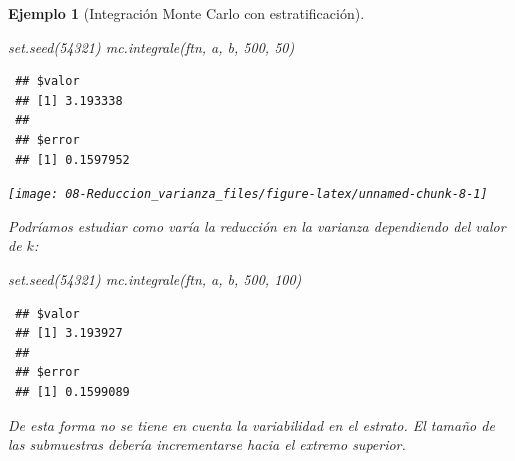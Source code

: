 \documentclass[
]{book}
\newenvironment{Shaded}{\begin{snugshade}}{\end{snugshade}}
\newcommand{\DecValTok}[1]{\textcolor[rgb]{0.00,0.00,0.81}{#1}}
\newcommand{\FunctionTok}[1]{\textcolor[rgb]{0.00,0.00,0.00}{#1}}
\newcommand{\NormalTok}[1]{#1}
\theoremstyle{break}
\newtheorem{example}{Ejemplo}[chapter]
\theoremstyle{nonumberplain}
\begin{document}
\begin{example}[Integración Monte Carlo con estratificación]
\begin{Shaded}
\begin{Highlighting}[]
\FunctionTok{set.seed}\NormalTok{(}\DecValTok{54321}\NormalTok{)}
\FunctionTok{mc.integrale}\NormalTok{(ftn, a, b, }\DecValTok{500}\NormalTok{, }\DecValTok{50}\NormalTok{)}
\end{Highlighting}
\end{Shaded}

\begin{verbatim}
 ## $valor
 ## [1] 3.193338
 ## 
 ## $error
 ## [1] 0.1597952
\end{verbatim}

\begin{center}\texttt{[image: 08-Reduccion\_varianza\_files/figure-latex/unnamed-chunk-8-1]} \end{center}

Podríamos estudiar como varía la reducción en la varianza dependiendo del valor de \(k\):

\begin{Shaded}
\begin{Highlighting}[]
\FunctionTok{set.seed}\NormalTok{(}\DecValTok{54321}\NormalTok{)}
\FunctionTok{mc.integrale}\NormalTok{(ftn, a, b, }\DecValTok{500}\NormalTok{, }\DecValTok{100}\NormalTok{)}
\end{Highlighting}
\end{Shaded}

\begin{verbatim}
 ## $valor
 ## [1] 3.193927
 ## 
 ## $error
 ## [1] 0.1599089
\end{verbatim}

De esta forma no se tiene en cuenta la variabilidad en el estrato.
El tamaño de las submuestras debería incrementarse hacia el extremo superior.
\end{example}
\end{document}
